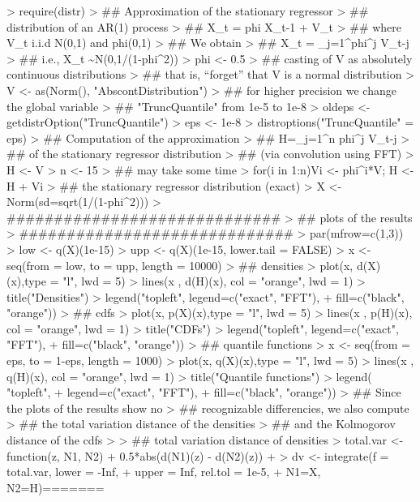 \documentclass[11pt]{article}
\begin{document}
\begin{Schunk}
\begin{Sinput}
> require(distr)
> ## Approximation of the stationary regressor 
> ## distribution of an AR(1) process 
> ##       X_t = phi X_{t-1} + V_t 
> ## where V_t i.i.d N(0,1) and phi\in(0,1)
> ## We obtain 
> ##    X_t = \sum_{j=1}^\infty phi^j V_{t-j}
> ## i.e., X_t \sim N(0,1/(1-phi^2))
> phi <- 0.5
> ## casting of V as absolutely continuous distributions
> ## that is, ``forget'' that V is a normal distribution
> V <- as(Norm(), "AbscontDistribution")
> ## for higher precision we change the global variable
> ## "TruncQuantile" from 1e-5 to 1e-8
> oldeps <- getdistrOption("TruncQuantile")
> eps <- 1e-8
> distroptions("TruncQuantile" = eps)
> ## Computation of the approximation 
> ##      H=\sum_{j=1}^n phi^j V_{t-j}
> ## of the stationary regressor distribution 
> ## (via convolution using FFT)
> H <- V
> n <- 15 
> ## may take some time
> for(i in 1:n){Vi <- phi^i*V; H <- H + Vi } 
> ## the stationary regressor distribution (exact)
> X <- Norm(sd=sqrt(1/(1-phi^2)))
> #############################
> ## plots of the results
> #############################
> par(mfrow=c(1,3))
> low <- q(X)(1e-15)
> upp <- q(X)(1e-15, lower.tail = FALSE)
> x <- seq(from = low, to = upp, length = 10000)
> ## densities
> plot(x, d(X)(x),type = "l", lwd = 5)
> lines(x , d(H)(x), col = "orange", lwd = 1)
> title("Densities")
> legend("topleft", legend=c("exact", "FFT"), 
+         fill=c("black", "orange"))
> ## cdfs
> plot(x, p(X)(x),type = "l", lwd = 5)
> lines(x , p(H)(x), col = "orange", lwd = 1)
> title("CDFs")
> legend("topleft", legend=c("exact", "FFT"), 
+         fill=c("black", "orange"))
> ## quantile functions
> x <- seq(from = eps, to = 1-eps, length = 1000)
> plot(x, q(X)(x),type = "l", lwd = 5)
> lines(x , q(H)(x), col = "orange", lwd = 1)
> title("Quantile functions")
> legend( "topleft", 
+         legend=c("exact", "FFT"), 
+         fill=c("black", "orange"))
> ## Since the plots of the results show no 
> ## recognizable differencies, we also compute 
> ## the total variation distance of the densities 
> ## and the Kolmogorov distance of the cdfs
> 
> ## total variation distance of densities
> total.var <- function(z, N1, N2){
+     0.5*abs(d(N1)(z) - d(N2)(z))
+ }
> dv <- integrate(f = total.var, lower = -Inf, 
+                 upper = Inf, rel.tol = 1e-5, 
+                 N1=X, N2=H)=======

\end{Sinput}
\end{Schunk}
\end{document}
